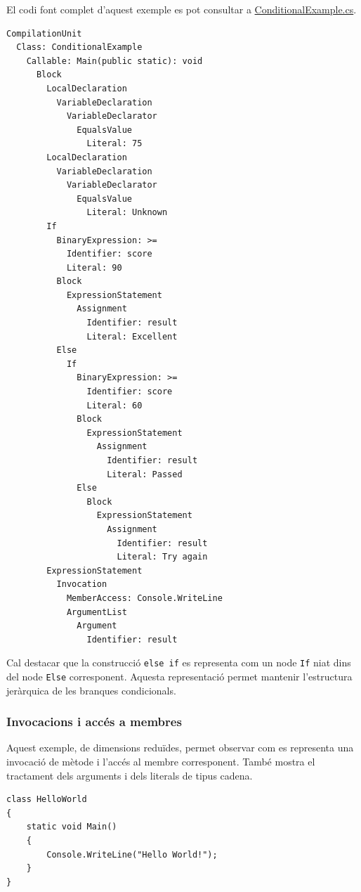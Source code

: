 El codi font complet d'aquest exemple es pot consultar
a \href{https://github.com/PauDiazM/static-code-analysis-tfg/blob/main/code_samples/examples/ConditionalExample.cs}{ConditionalExample.cs}.


\begin{lstlisting}[style=output,
    caption={Sortida resumida del mòdul Parser per a les estructures condicionals},
    label={lst:conditional-output}]
CompilationUnit
  Class: ConditionalExample
    Callable: Main(public static): void
      Block
        LocalDeclaration
          VariableDeclaration
            VariableDeclarator
              EqualsValue
                Literal: 75
        LocalDeclaration
          VariableDeclaration
            VariableDeclarator
              EqualsValue
                Literal: Unknown
        If
          BinaryExpression: >=
            Identifier: score
            Literal: 90
          Block
            ExpressionStatement
              Assignment
                Identifier: result
                Literal: Excellent
          Else
            If
              BinaryExpression: >=
                Identifier: score
                Literal: 60
              Block
                ExpressionStatement
                  Assignment
                    Identifier: result
                    Literal: Passed
              Else
                Block
                  ExpressionStatement
                    Assignment
                      Identifier: result
                      Literal: Try again
        ExpressionStatement
          Invocation
            MemberAccess: Console.WriteLine
            ArgumentList
              Argument
                Identifier: result
\end{lstlisting}

Cal destacar que la construcció \texttt{else if} es representa com un node
\texttt{If} niat dins del node \texttt{Else} corresponent. Aquesta representació
permet mantenir l'estructura jeràrquica de les branques condicionals.

\subsubsection*{Invocacions i accés a membres}
\label{sec:parser-invocations}

Aquest exemple, de dimensions reduïdes, permet observar com es representa una
invocació de mètode i l'accés al membre corresponent. També mostra el tractament
dels arguments i dels literals de tipus cadena.

\begin{lstlisting}[style=code,
    caption={Codi font de l'exemple d'invocació},
    label={lst:invocation-source}]
class HelloWorld
{
    static void Main()
    {
        Console.WriteLine("Hello World!");
    }
}
\end{lstlisting}

